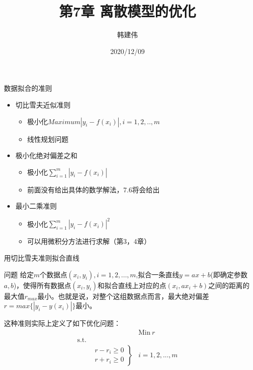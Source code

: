 \documentclass[UTF8]{ctexbeamer}
\title{第7章 离散模型的优化}
\author{韩建伟}
\institute{
  信息学院\\
  \texttt{hanjianwei@zjgsu.edu.cn}
}
\date{2020/12/09}
\begin{document}
\begin{frame}[plain]
  \titlepage{}
\end{frame}

\begin{frame}{数据拟合的准则}

  \begin{itemize}
  \item 切比雪夫近似准则
    \begin{itemize}
    \item 极小化$Maximum |y_i - f(x_i)|,  i = 1, 2, .., m$
    \item 线性规划问题
    \end{itemize}
  \item 极小化绝对偏差之和 
    \begin{itemize}
    \item 极小化$\sum_{i=1}^m |y_i - f(x_i)|$
    \item 前面没有给出具体的数学解法，7.6将会给出
    \end{itemize}
  \item 最小二乘准则 
    \begin{itemize}
    \item 极小化$\sum_{i=1}^m |y_i - f(x_i)|^2$
    \item 可以用微积分方法进行求解（第3，4章）
    \end{itemize}
  \end{itemize}
  
\end{frame}

\begin{frame}{用切比雪夫准则拟合直线}
  \begin{block}{问题}
    给定$m$个数据点$(x_i, y_i), i=1, 2, ..., m$,拟合一条直线$y=ax+b$(即确定参数$a, b$)，使得所有数据点$(x_i, y_i)$和拟合直线上对应的点$(x_i, ax_i+b)$之间的距离的最大值$r_{max}$最小。也就是说，对整个这组数据点而言，最大绝对偏差$r=max\{|y_i-y(x_i)|\}$最小。
  \end{block}

  这种准则实际上定义了如下优化问题：
  \[ 
  \begin{array}{lcl}
    & & \mbox{Min}\ r \\
    \mbox{s.t.} & &  \\
    &
    \left.
      \begin{array}{c}
        r-r_i \ge 0\\
        r+r_i \ge 0
      \end{array}
    \right\}& i = 1, 2, ... , m
  \end{array}
  \]
\end{frame}
\end{document}
